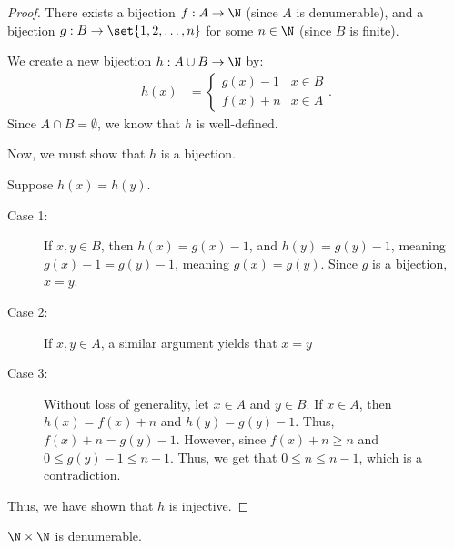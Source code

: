 \documentclass[10pt]{mypackage}
\begin{document}
\begin{proof}
  There exists a bijection $f: A\rightarrow \N$ (since $A$ is denumerable), and a bijection $g: B\rightarrow \set{1,2,\dots,n}$ for some $n \in \N$ (since $B$ is finite).\newline

  We create a new bijection $h: A\cup B \rightarrow \N$ by:
  \begin{align*}
    h(x) &= \begin{cases}
      g(x) - 1 & x\in B\\
      f(x) + n & x\in A
    \end{cases}.
  \end{align*}
  Since $A\cap B = \emptyset$, we know that $h$ is well-defined.\newline

  Now, we must show that $h$ is a bijection.\newline

  Suppose $h(x) = h(y)$.
  \begin{description}
    \item[Case 1:] If $x,y\in B$, then $h(x) = g(x) - 1$, and $h(y) = g(y) - 1$, meaning $g(x) - 1 = g(y) - 1$, meaning $g(x) = g(y)$. Since $g$ is a bijection, $x = y$.
    \item[Case 2:] If $x,y\in A$, a similar argument yields that $x = y$
    \item[Case 3:] Without loss of generality, let $x\in A$ and $y\in B$. If $x\in A$, then $h(x) = f(x) + n$ and $h(y) = g(y) - 1$. Thus, $f(x) + n = g(y) - 1$. However, since $f(x) + n \geq n$ and $0 \leq g(y) - 1 \leq n - 1$. Thus, we get that $0 \leq n \leq n-1$, which is a contradiction.
  \end{description}
  Thus, we have shown that $h$ is injective.
\end{proof}
\begin{theorem}
  $\N\times \N$ is denumerable.
\end{theorem}
\end{document}
